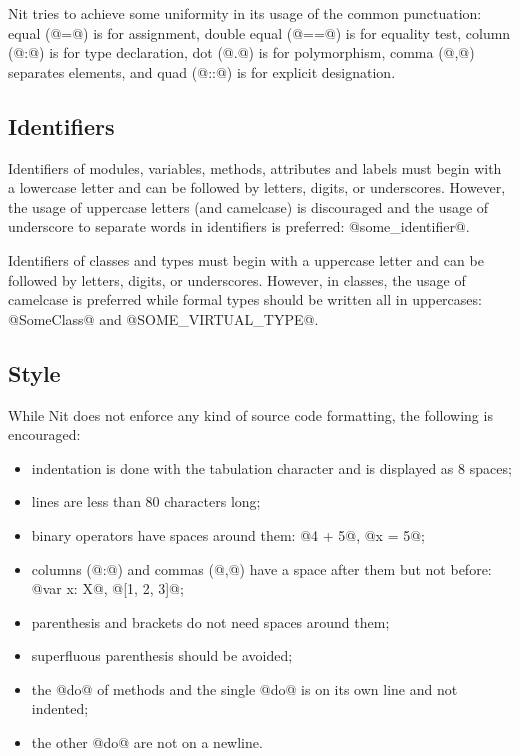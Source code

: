 Nit tries to achieve some uniformity in its usage of the common punctuation:
equal (@=@) is for assignment,
double equal (@==@) is for equality test, 
column (@:@) is for type declaration,
dot (@.@) is for polymorphism,
comma (@,@) separates elements,
and quad (@::@) is for explicit designation.

\subsection{Identifiers}\label{identifier}

Identifiers of modules, variables, methods, attributes and labels must begin with a lowercase letter and can be followed by letters, digits, or underscores.
However, the usage of uppercase letters (and camelcase) is discouraged and the usage of underscore to separate words in identifiers is preferred: @some_identifier@.

Identifiers of classes and types must begin with a uppercase letter and can be followed by letters, digits, or underscores.
However, in classes, the usage of camelcase is preferred while formal types should be written all in uppercases: @SomeClass@ and @SOME_VIRTUAL_TYPE@.

\subsection{Style}

While Nit does not enforce any kind of source code formatting, the following is encouraged:
\begin{itemize}
\item indentation is done with the tabulation character and is displayed as 8 spaces;
\item lines are less than 80 characters long;
\item binary operators have spaces around them: @4 + 5@, @x = 5@;
\item columns (@:@) and commas (@,@) have a space after them but not before: @var x: X@, @[1, 2, 3]@;
\item parenthesis and brackets do not need spaces around them;
\item superfluous parenthesis should be avoided;
\item the @do@ of methods and the single @do@ is on its own line and not indented;
\item the other @do@ are not on a newline.
\end{itemize}

